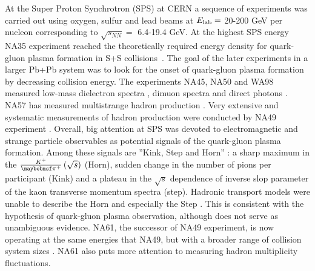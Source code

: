 At the Super Proton Synchrotron (SPS) at CERN a sequence of experiments
was carried out using oxygen, sulfur and lead
beams at $E_\mathrm{lab} = $ 20-200 GeV per nucleon corresponding to
$\sqrt{s_{NN}} = $ 6.4-19.4 GeV. At the highest SPS energy NA35
experiment reached the theoretically required energy density for
quark-gluon plasma formation in S+S collisions~\cite{Pugh:1989eb}. The goal of
the later experiments in a larger Pb+Pb system was to look for the onset of
quark-gluon plasma formation by decreasing collision energy. The experiments NA45,
NA50 and WA98 measured low-mass dielectron spectra \cite{Wessels:2002ha},
dimuon spectra \cite{Ramello:2003ig} and direct photons \cite{Aggarwal:1998vs}.
NA57 has measured multistrange hadron production \cite{Bruno:2004pv}. Very
extensive and systematic measurements of hadron production were conducted by
NA49 experiment \cite{Bachler:1999hu}.  Overall, big attention at SPS was
devoted to electromagnetic and strange particle observables as potential
signals of the quark-gluon plasma formation.  Among these signals are ''Kink,
Step and Horn'' \cite{Gazdzicki:2010iv,Rustamov:2012np}: a sharp maximum in the
$\frac{K^+}{\pi^+}\parenths{\sqrt{s}}$ (Horn), sudden change in the number of
pions per participant (Kink) and a plateau in the $\sqrt{s}$ dependence of
inverse slop parameter of the kaon transverse momentum spectra (step). Hadronic
transport models were unable to describe the Horn and especially the Step
\cite{Bratkovskaya:2003ny}. This is consistent with the hypothesis of
quark-gluon plasma observation, although does not serve as unambiguous
evidence.  NA61, the successor of NA49 experiment, is now operating at the same
energies that NA49, but with a broader range of collision system sizes
\cite{Gazdzicki:2011fx}. NA61 also puts more attention to measuring hadron
multiplicity fluctuations.

